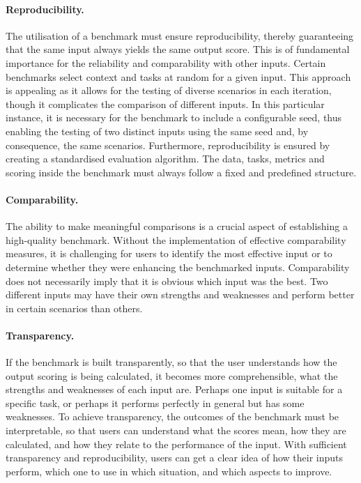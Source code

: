 \paragraph{Reproducibility.}
The utilisation of a benchmark must ensure reproducibility, thereby guaranteeing that the same input always yields the same output score. This is of fundamental importance for the reliability and comparability with other inputs. Certain benchmarks select context and tasks at random for a given input. This approach is appealing as it allows for the testing of diverse scenarios in each iteration, though it complicates the comparison of different inputs. In this particular instance, it is necessary for the benchmark to include a configurable seed, thus enabling the testing of two distinct inputs using the same seed and, by consequence, the same scenarios. Furthermore, reproducibility is ensured by creating a standardised evaluation algorithm. The data, tasks, metrics and scoring inside the benchmark must always follow a fixed and predefined structure.

\paragraph{Comparability.}
The ability to make meaningful comparisons is a crucial aspect of establishing a high-quality benchmark. Without the implementation of effective comparability measures, it is challenging for users to identify the most effective input or to determine whether they were enhancing the benchmarked inputs. Comparability does not necessarily imply that it is obvious which input was the best. Two different inputs may have their own strengths and weaknesses and perform better in certain scenarios than others. 

\paragraph{Transparency.}
If the benchmark is built transparently, so that the user understands how the output scoring is being calculated, it becomes more comprehensible, what the strengths and weaknesses of each input are. Perhaps one input is suitable for a specific task, or perhaps it performs perfectly in general but has some weaknesses. To achieve transparency, the outcomes of the benchmark must be interpretable, so that users can understand what the scores mean, how they are calculated, and how they relate to the performance of the input. With sufficient transparency and reproducibility, users can get a clear idea of how their inputs perform, which one to use in which situation, and which aspects to improve.

